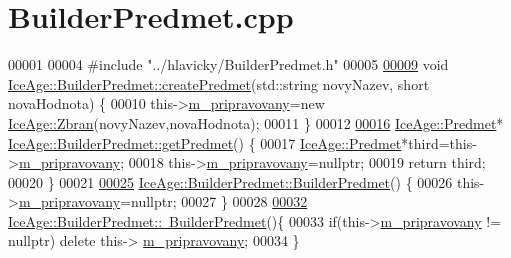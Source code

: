 \hypertarget{BuilderPredmet_8cpp_source}{}\section{Builder\+Predmet.\+cpp}
\label{BuilderPredmet_8cpp_source}

\begin{DoxyCode}
00001 
00004 \textcolor{preprocessor}{#include "../hlavicky/BuilderPredmet.h"}
00005 
\hypertarget{BuilderPredmet_8cpp_source.tex_l00009}{}\hyperlink{classIceAge_1_1BuilderPredmet_a4fcdb35cc3edcec69386f4a68ff95d28}{00009} \textcolor{keywordtype}{void} \hyperlink{classIceAge_1_1BuilderPredmet_a4fcdb35cc3edcec69386f4a68ff95d28}{IceAge::BuilderPredmet::createPredmet}(std::string novyNazev, \textcolor{keywordtype}{
      short} novaHodnota) \{
00010     this->\hyperlink{classIceAge_1_1BuilderPredmet_ab51158b23493b9c1bb891f8be4a69b5d}{m\_pripravovany}=\textcolor{keyword}{new} \hyperlink{classIceAge_1_1Zbran}{IceAge::Zbran}(novyNazev,novaHodnota);
00011 \}
00012 
\hypertarget{BuilderPredmet_8cpp_source.tex_l00016}{}\hyperlink{classIceAge_1_1BuilderPredmet_ab84508589d73e202dd4002d6b23ad22e}{00016} \hyperlink{classIceAge_1_1Predmet}{IceAge::Predmet}* \hyperlink{classIceAge_1_1BuilderPredmet_ab84508589d73e202dd4002d6b23ad22e}{IceAge::BuilderPredmet::getPredmet}() \{
00017     \hyperlink{classIceAge_1_1Predmet}{IceAge::Predmet}*third=this->\hyperlink{classIceAge_1_1BuilderPredmet_ab51158b23493b9c1bb891f8be4a69b5d}{m\_pripravovany};
00018     this->\hyperlink{classIceAge_1_1BuilderPredmet_ab51158b23493b9c1bb891f8be4a69b5d}{m\_pripravovany}=\textcolor{keyword}{nullptr};
00019     \textcolor{keywordflow}{return} third;
00020 \}
00021 
\hypertarget{BuilderPredmet_8cpp_source.tex_l00025}{}\hyperlink{classIceAge_1_1BuilderPredmet_ab13db2f68a2c79a59e093fcb8d517f04}{00025} \hyperlink{classIceAge_1_1BuilderPredmet_ab13db2f68a2c79a59e093fcb8d517f04}{IceAge::BuilderPredmet::BuilderPredmet}() \{
00026     this->\hyperlink{classIceAge_1_1BuilderPredmet_ab51158b23493b9c1bb891f8be4a69b5d}{m\_pripravovany}=\textcolor{keyword}{nullptr};
00027 \}
00028 
\hypertarget{BuilderPredmet_8cpp_source.tex_l00032}{}\hyperlink{classIceAge_1_1BuilderPredmet_a4fdc3033e390d15dc12c540b2b6c6456}{00032} \hyperlink{classIceAge_1_1BuilderPredmet_a4fdc3033e390d15dc12c540b2b6c6456}{IceAge::BuilderPredmet::~BuilderPredmet}()\{
00033     \textcolor{keywordflow}{if}(this->\hyperlink{classIceAge_1_1BuilderPredmet_ab51158b23493b9c1bb891f8be4a69b5d}{m\_pripravovany} != \textcolor{keyword}{nullptr}) \textcolor{keyword}{delete} this->
      \hyperlink{classIceAge_1_1BuilderPredmet_ab51158b23493b9c1bb891f8be4a69b5d}{m\_pripravovany};
00034 \}
\end{DoxyCode}
